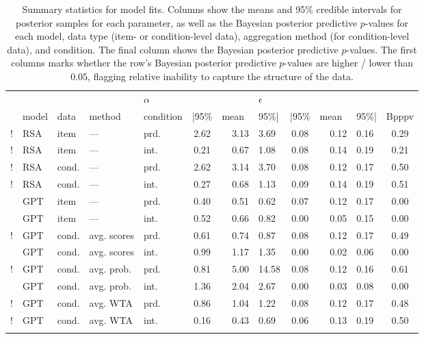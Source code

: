 \documentclass[fleqn]{article}
\begin{document}
\begin{table}[t]
\centering
\begin{tabular}{cllllcrlcrlc}
  \toprule
  &&&& $\alpha$ &&& $\epsilon$ & \\ \cmidrule(r){4-6} \cmidrule(l){7-9}
  & model & data & method & condition & |95\% & mean\ & 95\%| & |95\% & mean\ & 95\%| & Bpppv \\
  \midrule
  ! & RSA & item  & ---         & prd. & 2.62 & 3.13 & 3.69  & 0.08 & 0.12 & 0.16 & 0.29 \\
  ! & RSA & item  & ---         & int. & 0.21 & 0.67 & 1.08  & 0.08 & 0.14 & 0.19 & 0.21 \\
  ! & RSA & cond. & ---         & prd. & 2.62 & 3.14 & 3.70  & 0.08 & 0.12 & 0.17 & 0.50 \\
  ! & RSA & cond. & ---         & int. & 0.27 & 0.68 & 1.13  & 0.09 & 0.14 & 0.19 & 0.51 \\ \addlinespace[0.5em]
    & GPT & item  & ---         & prd. & 0.40 & 0.51 & 0.62  & 0.07 & 0.12 & 0.17 & 0.00 \\
    & GPT & item  & ---         & int. & 0.52 & 0.66 & 0.82  & 0.00 & 0.05 & 0.15 & 0.00 \\
  ! & GPT & cond. & avg. scores & prd. & 0.61 & 0.74 & 0.87  & 0.08 & 0.12 & 0.17 & 0.49 \\
    & GPT & cond. & avg. scores & int. & 0.99 & 1.17 & 1.35  & 0.00 & 0.02 & 0.06 & 0.00 \\
  ! & GPT & cond. & avg. prob.  & prd. & 0.81 & 5.00 & 14.58 & 0.08 & 0.12 & 0.16 & 0.61 \\
    & GPT & cond. & avg. prob.  & int. & 1.36 & 2.04 & 2.67  & 0.00 & 0.03 & 0.08 & 0.00 \\
  ! & GPT & cond. & avg. WTA    & prd. & 0.86 & 1.04 & 1.22  & 0.08 & 0.12 & 0.17 & 0.48 \\
  ! & GPT & cond. & avg. WTA    & int. & 0.16 & 0.43 & 0.69  & 0.06 & 0.13 & 0.19 & 0.50 \\
   \bottomrule \\
\end{tabular}
\caption{
  Summary statistics for model fits.
  Columns show the means and 95\% credible intervals for posterior samples for each parameter, as well as the Bayesian posterior predictive $p$-values for each model, data type (item- or condition-level data), aggregation method (for condition-level data), and condition.
  The final column shows the Bayesian posterior predictive $p$-values.
  The first columns marks whether the row's Bayesian posterior predictive $p$-values are higher / lower than $0.05$, flagging relative inability to capture the structure of the data.
}
\label{tab:sumStats}
\end{table}
\end{document}
